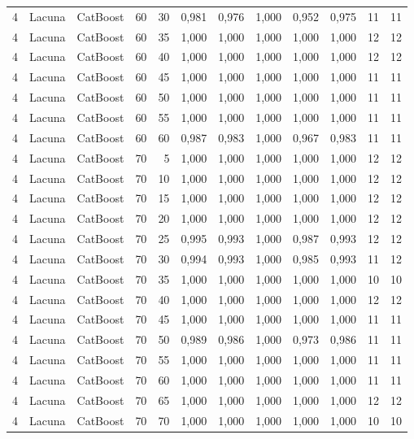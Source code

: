 \begin{longtable}{@{}rllrrrrrrrrr@{}}
4 & Lacuna & CatBoost & 60 & 30 & 0,981 & 0,976 & 1,000 & 0,952 & 0,975 & 11 & 11 \\
4 & Lacuna & CatBoost & 60 & 35 & 1,000 & 1,000 & 1,000 & 1,000 & 1,000 & 12 & 12 \\
4 & Lacuna & CatBoost & 60 & 40 & 1,000 & 1,000 & 1,000 & 1,000 & 1,000 & 12 & 12 \\
4 & Lacuna & CatBoost & 60 & 45 & 1,000 & 1,000 & 1,000 & 1,000 & 1,000 & 11 & 11 \\
4 & Lacuna & CatBoost & 60 & 50 & 1,000 & 1,000 & 1,000 & 1,000 & 1,000 & 11 & 11 \\
4 & Lacuna & CatBoost & 60 & 55 & 1,000 & 1,000 & 1,000 & 1,000 & 1,000 & 11 & 11 \\
4 & Lacuna & CatBoost & 60 & 60 & 0,987 & 0,983 & 1,000 & 0,967 & 0,983 & 11 & 11 \\
4 & Lacuna & CatBoost & 70 & 5 & 1,000 & 1,000 & 1,000 & 1,000 & 1,000 & 12 & 12 \\
4 & Lacuna & CatBoost & 70 & 10 & 1,000 & 1,000 & 1,000 & 1,000 & 1,000 & 12 & 12 \\
4 & Lacuna & CatBoost & 70 & 15 & 1,000 & 1,000 & 1,000 & 1,000 & 1,000 & 12 & 12 \\
4 & Lacuna & CatBoost & 70 & 20 & 1,000 & 1,000 & 1,000 & 1,000 & 1,000 & 12 & 12 \\
4 & Lacuna & CatBoost & 70 & 25 & 0,995 & 0,993 & 1,000 & 0,987 & 0,993 & 12 & 12 \\
4 & Lacuna & CatBoost & 70 & 30 & 0,994 & 0,993 & 1,000 & 0,985 & 0,993 & 11 & 12 \\
4 & Lacuna & CatBoost & 70 & 35 & 1,000 & 1,000 & 1,000 & 1,000 & 1,000 & 10 & 10 \\
4 & Lacuna & CatBoost & 70 & 40 & 1,000 & 1,000 & 1,000 & 1,000 & 1,000 & 12 & 12 \\
4 & Lacuna & CatBoost & 70 & 45 & 1,000 & 1,000 & 1,000 & 1,000 & 1,000 & 11 & 11 \\
4 & Lacuna & CatBoost & 70 & 50 & 0,989 & 0,986 & 1,000 & 0,973 & 0,986 & 11 & 11 \\
4 & Lacuna & CatBoost & 70 & 55 & 1,000 & 1,000 & 1,000 & 1,000 & 1,000 & 11 & 11 \\
4 & Lacuna & CatBoost & 70 & 60 & 1,000 & 1,000 & 1,000 & 1,000 & 1,000 & 11 & 11 \\
4 & Lacuna & CatBoost & 70 & 65 & 1,000 & 1,000 & 1,000 & 1,000 & 1,000 & 12 & 12 \\
4 & Lacuna & CatBoost & 70 & 70 & 1,000 & 1,000 & 1,000 & 1,000 & 1,000 & 10 & 10 \\

\end{longtable}
